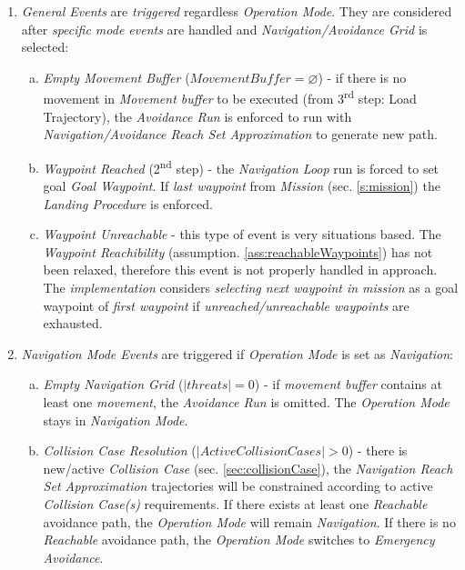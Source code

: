 \begin{enumerate}
    \item \emph{General Events} are \emph{triggered} regardless \emph{Operation Mode}. They are considered after \emph{specific mode events} are handled and \emph{Navigation/Avoidance Grid} is selected:
    \begin{enumerate}[a.]
        \item \emph{Empty Movement Buffer} ($Movement Buffer = \varnothing$) - if there is no movement in \emph{Movement buffer} to be executed (from 3\textsuperscript{rd} step: Load Trajectory), the \emph{Avoidance Run} is enforced to run with \emph{Navigation/Avoidance Reach Set Approximation} to generate new path.
        
        \item \emph{Waypoint Reached} (2\textsuperscript{nd} step) - the \emph{Navigation Loop} run is forced to set goal \emph{Goal Waypoint}. If \emph{last waypoint} from \emph{Mission} (sec. \ref{s:mission}) the \emph{Landing Procedure} is enforced.
        
        \item \emph{Waypoint Unreachable} - this type of event is very situations based. The \emph{Waypoint Reachibility} (assumption. \ref{ass:reachableWaypoints}) has not been relaxed, therefore this event is not properly handled in approach. The \emph{implementation} considers \emph{selecting next waypoint in mission} as a goal waypoint of \emph{first waypoint} if \emph{unreached/unreachable waypoints} are exhausted. 
    \end{enumerate}
    
    \item \emph{Navigation Mode Events} are triggered if \emph{Operation Mode} is set as \emph{Navigation}:
    \begin{enumerate}[a.]
        \item \emph{Empty Navigation Grid} ($|threats| = 0$) - if \emph{movement buffer} contains at least one \emph{movement}, the \emph{Avoidance Run} is omitted. The \emph{Operation Mode} stays in \emph{Navigation Mode}.
        
        \item \emph{Collision Case Resolution} ($|ActiveCollisionCases| > 0$) - there is new/active \emph{Collision Case} (sec. \ref{sec:collisionCase}), the \emph{Navigation Reach Set Approximation} trajectories will be constrained according to  active \emph{Collision Case(s)} requirements. If there exists at least one \emph{Reachable} avoidance path, the \emph{Operation Mode} will remain \emph{Navigation}. If there is no  \emph{Reachable} avoidance path, the \emph{Operation Mode} switches to \emph{Emergency Avoidance}.
        

\end{enumerate}
\end{enumerate}
